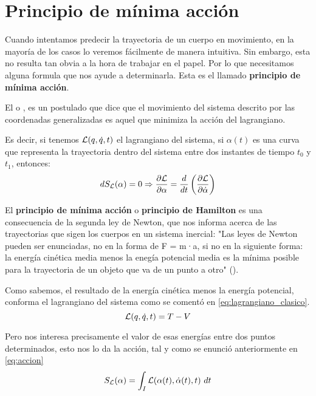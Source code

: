 \section{Principio de mínima acción}\label{sec:principio-de-minima-accion}

Cuando intentamos predecir la trayectoria de un cuerpo en movimiento, en la mayoría de los casos lo veremos fácilmente de manera intuitiva. Sin embargo, esta no resulta tan obvia a la hora de trabajar en el papel. Por lo que necesitamos alguna formula que nos ayude a determinarla. Esta es el llamado \textbf{principio de mínima acción}.

El  o , es un postulado que dice que el movimiento del sistema descrito por las coordenadas generalizadas es aquel que minimiza la acción del lagrangiano\label{po:pma}.

Es decir, si tenemos $\mathcal{L}(q,\dot{q}, t)$ el lagrangiano del sistema, si $\alpha(t)$ es una curva que representa la trayectoria dentro del sistema entre dos instantes de tiempo $t_0$ y $t_1$, entonces:
\begin{equation*}
	dS_{\mathcal{L}}(\alpha)=0\Rightarrow \frac{\partial \mathcal{L}}{\partial \alpha}=\frac{d}{dt}\left( \frac{\partial \mathcal{L}}{\partial \dot{\alpha}} \right)
\end{equation*}

El \textbf{principio de mínima acción} o \textbf{principio de Hamilton} es una consecuencia de la segunda ley de Newton, que nos informa acerca de las trayectorias que sigen los cuerpos en un sistema inercial:
"Las leyes de Newton pueden ser enunciadas, no en la forma de F = m·a, si no en la siguiente forma: la energía cinética media menos la enegía potencial media es la mínima posible para la trayectoria de un objeto que va de un punto a otro" (\cite{Feynman}).

Como sabemos, el resultado de la energía cinética menos la energía potencial, conforma el lagrangiano del sistema como se comentó en \eqref{eq:lagrangiano_clasico}.
\begin{equation}
	\label{eq:lagrangiano_clasico_corto}
	\mathcal{L}(q,\dot{q},t)=T-V
\end{equation}

Pero nos interesa precisamente el valor de esas energías entre dos puntos determinados, esto nos lo da la acción, tal y como se enunció anteriormente en \eqref{eq:accion}
\begin{equation}
	S_{\mathcal{L}}(\alpha) = \int_{I}\mathcal{L}(\alpha(t), \dot{\alpha}(t), t)\ dt
\end{equation}

